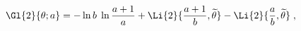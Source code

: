 \begin{equation}
\label{Gl2_gen}
\Gl{2}{\theta; a} = -\ln{b}\;\ln\frac{a+1}{a}
+ \Li{2}{\frac{a+1}{b},\widetilde{\theta}}
- \Li{2}{\frac{a}{b},\widetilde{\theta}}\; ,
\end{equation}

